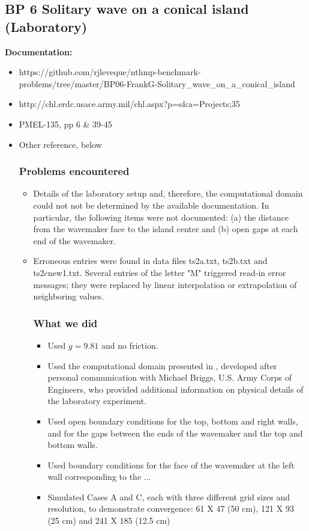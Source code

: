 \subsection{BP 6
  Solitary wave on a conical island (Laboratory)}

{\bf Documentation:}
\begin {itemize}

\item https://github.com/rjleveque/nthmp-benchmark-problems/tree/master/BP06-FrankG-Solitary_wave_on_a_conical_island
\item http://chl.erdc.usace.army.mil/chl.aspx?p=s&a=Projects;35
\item PMEL-135, pp 6 \& 39-45
\item Other reference, below

\subsubsection {Problems encountered}

\begin {itemize}
\item Details of the laboratory setup and, therefore, the computational domain could not not be determined by the available documentation.  In particular, the following items were not documented: (a) the distance from the wavemaker face to the island center and (b) open gaps at each end of the wavemaker.
\item Erroneous entries were found in data files ts2a.txt, ts2b.txt and ts2cnew1.txt.  Several entries of the letter "M" triggered read-in error messages; they were replaced by linear interpolation or extrapolation of neighboring values.

\subsubsection{What we did}

\begin{itemize}
\item Used $g=9.81$ and no friction.
\item Used the computational domain presented in , developed after personal communication with Michael Briggs, U.S. Army Corps of Engineers, who  provided additional information on physical details of the laboratory experiment.
\item Used open boundary conditions for the top, bottom and right walls, and for the gaps between the ends of the wavemaker and the top and bottom walls.
\item Used boundary conditions for the face of the wavemaker at the left wall corresponding to the ...  
\item Simulated Cases A and C, each with three different grid sizes and resolution, to demonstrate convergence:  61 X 47 (50 cm), 121 X 93 (25 cm) and 241 X 185 (12.5 cm)



\end{itemize}
\end{itemize}
\end{itemize}
